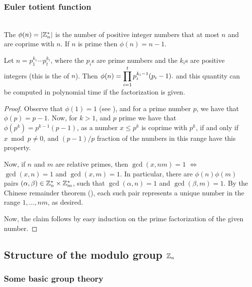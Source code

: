 \subsubsection{Euler totient function}
%
\mbox{}\\
The  $\phi(n) = \left| {\mathbb{Z}_n^*} \right|$ is the
number of positive integer numbers that at most $n$ and are
coprime with $n$. If $n$ is prime then $\phi(n)=n-1$.

\begin{lemma}
    Let $n=p_1^{k_1} \cdots p_t^{k_t}$, where the $p_i$s are prime
    numbers and the $k_i$s are positive integers (this is the
     of $n$). Then 
    \begin{math}
        \displaystyle \phi(n) = \prod_{i=1}^t p_{i}^{k_i -1} (p_{i} -1).
    \end{math}
    and this quantity can be computed in polynomial time if the
    factorization is given.
\end{lemma}
\begin{proof}
    Observe that $\phi(1) = 1$ (see ), and for a prime
    number $p$, we have that $\phi(p) = p-1$. Now, for $k > 1$, and
    $p$ prime we have that $\phi(p^k) = p^{k-1} (p-1)$, as a number $x
    \leq p^k$ is coprime with $p^k$, if and only if $x \bmod p \neq
    0$, and $(p-1)/p$ fraction of the numbers in this range have this
    property.
    
    Now, if $n$ and $m$ are relative primes, then $\gcd(x,nm) =1$
    $\iff$ $\gcd(x,n) =1$ and $\gcd(x,m)=1$. In particular, there are
    $\phi(n)\phi(m)$ pairs $(\alpha, \beta)\in \mathbb{Z}_n^* \times
    \mathbb{Z}_m^*$, such that $\gcd(\alpha, n )=1$ and $\gcd(\beta, m
    )=1$. By the Chinese remainder theorem
    (), each such pair represents a unique
    number in the range $1,\ldots, nm$, as desired.

    Now, the claim follows by easy induction on the prime
    factorization of the given number.
\end{proof}


\subsection{Structure of the modulo group $\mathbb{Z}_n$}
\subsubsection{Some basic group theory}


